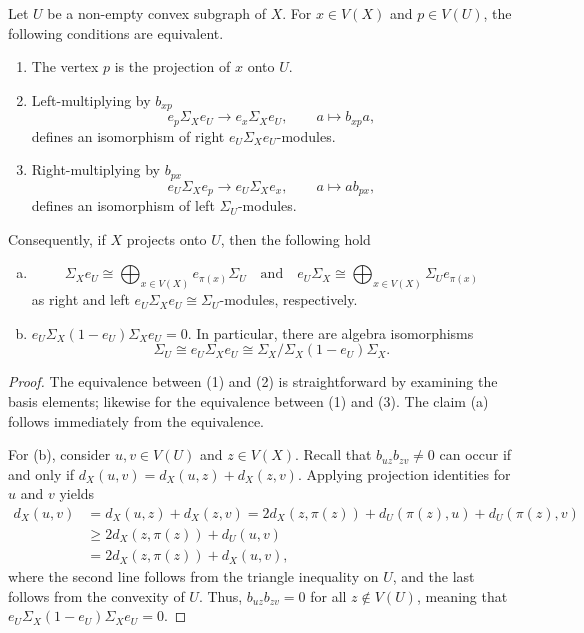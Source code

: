 \documentclass[a4paper,leqno]{amsart}
\begin{document}
\begin{prop}\label{prop:projecting-distance-algebra}
Let $U$ be a non-empty convex subgraph of $X$. 
For $x\in V(X)$ and $p\in V(U)$, the following conditions are
equivalent.
\begin{enumerate}
    \item The vertex $p$ is the projection of $x$ onto $U$.
    \item Left-multiplying by $b_{xp}$ 
    \[
    e_p\Sigma_X e_U\longrightarrow e_x\Sigma_Xe_U,
    \qquad a\longmapsto b_{xp}a,
    \]
    defines an isomorphism of right $e_U\Sigma_Xe_U$-modules.
    \item Right-multiplying by $b_{px}$ 
    \[
    e_U\Sigma_X e_p\longrightarrow e_U\Sigma_Xe_x,
    \qquad a\longmapsto ab_{px},
    \]
    defines an isomorphism of left $\Sigma_U$-modules.
\end{enumerate}
Consequently, if $X$ projects onto $U$, then the following hold
\begin{enumerate}[(a)]
\item \[
\Sigma_Xe_U
\cong
\bigoplus_{x\in V(X)}e_{\pi(x)}\Sigma_U
\quad\text{and}\quad 
e_U\Sigma_X
\cong
\bigoplus_{x\in V(X)}\Sigma_Ue_{\pi(x)}
\]
as right and left $e_U\Sigma_Xe_U\cong \Sigma_U$-modules, respectively.

\item $e_U\Sigma_X (1-e_U)\Sigma_X e_U=0$.  In particular, there are algebra isomorphisms \[
\Sigma_U \cong e_U \Sigma_X e_U\cong 
\Sigma_X/\Sigma_X(1-e_U)\Sigma_X.\]
\end{enumerate}
\end{prop}
\begin{proof}
The equivalence between (1) and (2) is straightforward by examining the basis elements; likewise for the equivalence between (1) and (3).  The claim (a) follows immediately from the equivalence.

For (b), consider $u,v\in V(U)$ and $z\in V(X)$.
Recall that $b_{uz}b_{zv}\neq 0$ can occur if and only if $d_X(u,v)=d_X(u,z)+d_X(z,v)$.
Applying projection identities for $u$ and $v$ yields
\begin{align*}
d_X(u,v) &= d_X(u,z)+d_X(z,v) = 2d_X(z,\pi(z))+d_U(\pi(z),u)+d_U(\pi(z),v) \\
& \geq 2d_X(z,\pi(z))+d_U(u,v) \\
& = 2d_X(z,\pi(z))+d_X(u,v),
\end{align*} where the second line follows from the triangle inequality on $U$, and the last follows from the convexity of $U$.
Thus, $b_{uz}b_{zv}=0$ for all $z\notin V(U)$, meaning that $e_U\Sigma_X(1-e_U)\Sigma_Xe_U=0$.
\end{proof}
\end{document}

